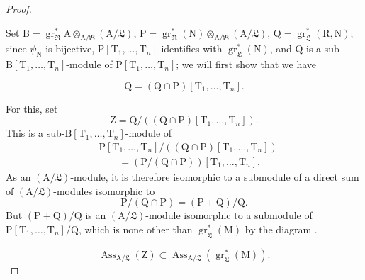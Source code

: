 \begin{proof}
\begin{env}[19.7.1.2]
\label{IV.19.7.1.2}
Set $\mathrm{B}=\operatorname{gr}_\mathfrak{R}^*\mathrm{A}\otimes_{\mathrm{A}/\mathfrak{R}}(\mathrm{A}/\mathfrak{L})$, $\mathrm{P}=\operatorname{gr}_\mathfrak{R}^*(\mathrm{N})\otimes_{\mathrm{A}/\mathfrak{R}}(\mathrm{A}/\mathfrak{L})$, $\mathrm{Q}=\operatorname{gr}_\mathfrak{L}^*(\mathrm{R},\mathrm{N})$; since $\psi_\mathrm{N}$ is bijective, $\mathrm{P}[\mathrm{T}_1,\ldots,\mathrm{T}_n]$ identifies with $\operatorname{gr}_\mathfrak{L}^*(\mathrm{N})$, and $\mathrm{Q}$ is a sub-$\mathrm{B}[\mathrm{T}_1,\ldots,\mathrm{T}_n]$-module of $\mathrm{P}[\mathrm{T}_1,\ldots,\mathrm{T}_n]$; we will first show that we have
\end{env}
\begin{env}[19.7.1.3]
\label{IV.19.7.1.3}
\[
  \mathrm{Q}=(\mathrm{Q}\cap\mathrm{P})[\mathrm{T}_1,\ldots,\mathrm{T}_n].
\]
\end{env}

For this, set
\[
  \mathrm{Z}=\mathrm{Q}/((\mathrm{Q}\cap\mathrm{P})[\mathrm{T}_1,\ldots,\mathrm{T}_n]).
\]
This is a sub-$\mathrm{B}[\mathrm{T}_1,\ldots,\mathrm{T}_n]$-module of
\[
  \begin{aligned}
  &\mathrm{P}[\mathrm{T}_1,\ldots,\mathrm{T}_n]
  /((\mathrm{Q}\cap\mathrm{P})[\mathrm{T}_1,\ldots,\mathrm{T}_n])\\
  &\qquad=(\mathrm{P}/(\mathrm{Q}\cap\mathrm{P}))[\mathrm{T}_1,\ldots,\mathrm{T}_n].
  \end{aligned}
\]
As an $(\mathrm{A}/\mathfrak{L})$-module, it is therefore isomorphic to a submodule of a direct sum of $(\mathrm{A}/\mathfrak{L})$-modules isomorphic to
\[
  \mathrm{P}/(\mathrm{Q}\cap\mathrm{P})=(\mathrm{P}+\mathrm{Q})/\mathrm{Q}.
\]
But $(\mathrm{P}+\mathrm{Q})/\mathrm{Q}$ is an $(\mathrm{A}/\mathfrak{L})$-module isomorphic to a submodule of $\mathrm{P}[\mathrm{T}_1,\ldots,\mathrm{T}_n]/\mathrm{Q}$, which is none other than $\operatorname{gr}_\mathfrak{L}^*(\mathrm{M})$ by the diagram .

\begin{equation}
  \operatorname{Ass}_{\mathrm{A}/\mathfrak{L}}(\mathrm{Z})\subset\operatorname{Ass}_{\mathrm{A}/\mathfrak{L}}(\operatorname{gr}_\mathfrak{L}^*(\mathrm{M})).
  \tag{19.7.1.4}\label{IV.19.7.1.4}
\end{equation}


\end{proof}
